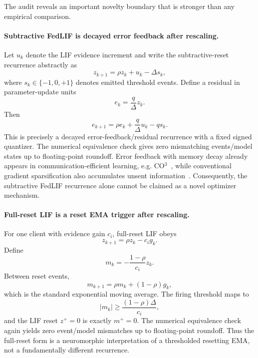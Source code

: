 The audit reveals an important novelty boundary that is stronger than any empirical comparison.

\paragraph{Subtractive FedLIF is decayed error feedback after rescaling.}
Let $u_k$ denote the LIF evidence increment and write the subtractive-reset recurrence abstractly as
\begin{equation}
  z_{k+1}=\rho z_k+u_k-\Delta s_k,
\end{equation}
where $s_k\in\{-1,0,+1\}$ denotes emitted threshold events. Define a residual in parameter-update units
\begin{equation}
  e_k=\frac{q}{\Delta}z_k.
\end{equation}
Then
\begin{equation}
  e_{k+1}=\rho e_k+\frac{q}{\Delta}u_k-q s_k.
\end{equation}
This is precisely a decayed error-feedback/residual recurrence with a fixed signed quantizer. The numerical equivalence check gives zero mismatching events/model states up to floating-point roundoff. Error feedback with memory decay already appears in communication-efficient learning, e.g. CO$^3$~\cite{chen2022co3}, while conventional gradient sparsification also accumulates unsent information~\cite{lin2017dgc,stich2018memory}. Consequently, the subtractive FedLIF recurrence alone cannot be claimed as a novel optimizer mechanism.

\paragraph{Full-reset LIF is a reset EMA trigger after rescaling.}
For one client with evidence gain $c_i$, full-reset LIF obeys
\begin{equation}
  z_{k+1}=\rho z_k-c_i g_k.
\end{equation}
Define
\begin{equation}
  m_k=-\frac{1-\rho}{c_i}z_k.
\end{equation}
Between reset events,
\begin{equation}
  m_{k+1}=\rho m_k+(1-\rho)g_k,
\end{equation}
which is the standard exponential moving average. The firing threshold maps to
\begin{equation}
  |m_k|\geq \frac{(1-\rho)\Delta}{c_i},
\end{equation}
and the LIF reset $z^+=0$ is exactly $m^+=0$. The numerical equivalence check again yields zero event/model mismatches up to floating-point roundoff. Thus the full-reset form is a neuromorphic interpretation of a thresholded resetting EMA, not a fundamentally different recurrence.

